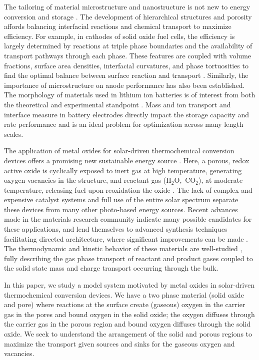 \documentclass[11pt]{article}
\begin{document}
The tailoring of material microstructure and nanostructure is not new to energy conversion and storage \cite{li,arico}.  The development of hierarchical structures and porosity affords balancing interfacial reactions and chemical transport to maximize efficiency.  For example, in cathodes of solid oxide fuel cells, the efficiency is largely determined by reactions at triple phase boundaries and the availability of transport pathways through each phase.  These features are coupled with volume fractions, surface area densities, interfacial curvatures, and phase tortuosities to find the optimal balance between surface reaction and transport \cite{wilson,smith}.  Similarly, the importance of microstructure on anode performance \cite{atkinson,suzuki,cronin,clemmer} has also been established.  The morphology of materials used in lithium ion batteries is of interest from both the theoretical \cite{stephenson,chen2010porous,bruce} and experimental standpoint \cite{hu,jia,wen}.  Mass and ion transport and interface measure in battery electrodes directly impact the storage capacity and rate performance and is an ideal problem for optimization across many length scales.

The application of metal oxides for solar-driven thermochemical conversion devices offers a promising new sustainable energy source \cite{Chueh}.  Here, a porous, redox active oxide is cyclically exposed to inert gas at high temperature, generating oxygen vacancies in the structure, and reactant gas ($\text{H}_2\text{O},\text{ CO}_2$), at moderate temperature, releasing fuel upon reoxidation the oxide \cite{umeda}.  The lack of complex and expensive catalyst systems and full use of the entire solar spectrum separate these devices from many other photo-based energy sources.  Recent advances made in the materials research community indicate many possible candidates for these applications, and lend themselves to advanced synthesis techniques facilitating directed architecture, where significant improvements can be made \cite{venstrom}.  The thermodynamic and kinetic behavior of these materials are well-studied \cite{lai,Chuehb,gopal}, fully describing the gas phase transport of reactant and product gases coupled to the solid state mass and charge transport occurring through the bulk.   

In this paper, we study a model system motivated by metal oxides in solar-driven thermochemical conversion devices.  We have a two phase material (solid oxide and pore) where reactions at the surface create (gaseous) oxygen in the carrier gas in the pores and bound oxygen in the solid oxide; the oxygen diffuses through the carrier gas in the porous region and bound oxygen diffuses through the solid oxide.  We seek to understand the arrangement of the solid and porous regions to maximize the transport given sources and sinks for the gaseous oxygen and vacancies.  
\end{document}
